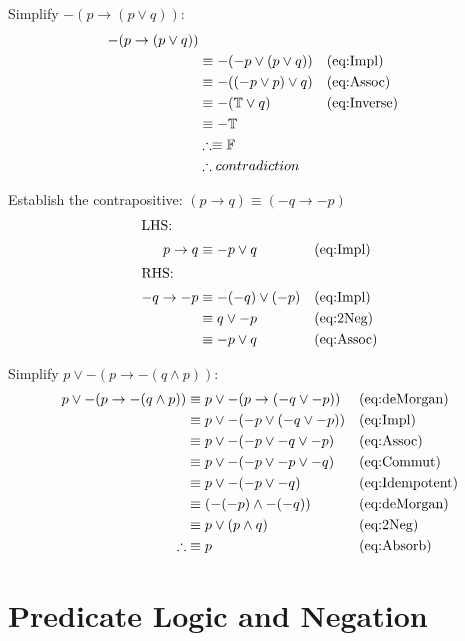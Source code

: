 Simplify $ -(p \to (p \lor q)) $:
\begin{align}
  -(p \to (p \lor q)) & \\
  & \equiv -(-p \lor (p \lor q))   && \text{(eq:Impl)}\\
  & \equiv -((-p \lor p) \lor q)   && \text{(eq:Assoc)}\\
  & \equiv -(\mathbb{T} \lor q)    && \text{(eq:Inverse)}\\
  & \equiv -\mathbb{T} && \\
  & \therefore \equiv \mathbb{F} && \\
  & \therefore contradiction
\end{align}

Establish the contrapositive: $ (p \to q ) \equiv (-q \to -p)$
\begin{align}
  \intertext{LHS:}
  p \to q & \equiv -p \lor q         && \text{(eq:Impl)}\\
  \intertext{RHS:}
  -q \to -p & \equiv -(-q) \lor (-p) && \text{(eq:Impl)}\\
            & \equiv q \lor -p       && \text{(eq:2Neg)}\\
            & \equiv -p \lor q       && \text{(eq:Assoc)}
\end{align}

Simplify $p \lor -(p \to -(q \land p))$:
\begin{align}
  p \lor -(p \to -(q \land p)) & \equiv p \lor -(p \to (-q \lor -p))
                                          && \text{(eq:deMorgan)}\\
  & \equiv p \lor -(-p \lor (-q \lor -p)) && \text{(eq:Impl)}\\
  & \equiv p \lor -(-p \lor -q \lor -p )  && \text{(eq:Assoc)}\\
  & \equiv p \lor -(-p \lor -p \lor -q)   && \text{(eq:Commut)}\\
  & \equiv p \lor -(-p \lor -q)           && \text{(eq:Idempotent)}\\
  & \equiv (-(-p) \land -(-q))            && \text{(eq:deMorgan)}\\
  & \equiv p \lor (p \land q)             && \text{(eq:2Neg)}\\
  \therefore & \equiv p                   && \text{(eq:Absorb)}
\end{align}

\section{Predicate Logic and Negation}
\label{sec:PredicateLogicAndNegation}


